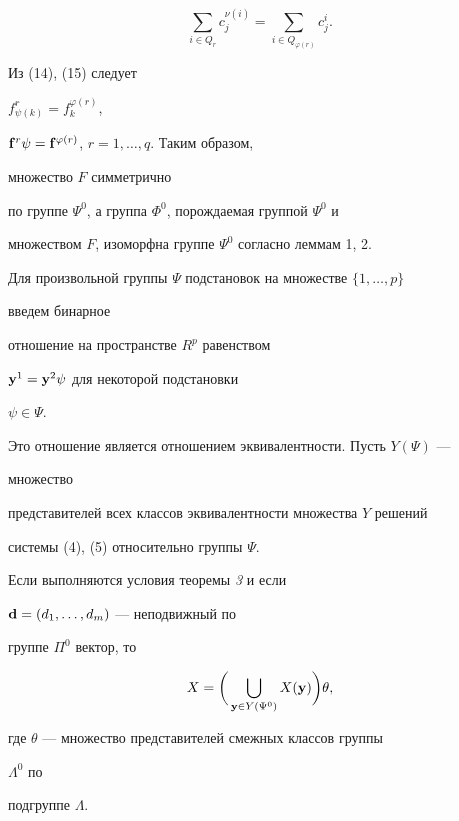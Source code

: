 \begin{pf}
\begin{equation}
\sum_{i\in Q_r}c^{\nu(i)}_j=\sum_{i\in Q_{\varphi(r)}}c^i_j.


\end{equation}


Из (14), (15) следует


$f^r_{\psi(k)}=f^{\varphi(r)}_k$,


$\bold f^r\psi=\bold f^{\varphi(r)}$, $r=1,\dotsc,q$. Таким образом,


множество $F$ симметрично


по группе $\Psi^0$, а группа $\Phi^0$, порождаемая группой $\Psi^0$ и


множеством $F$, изоморфна группе $\Psi^0$ согласно леммам 1, 2.


\end{pf}





Для произвольной группы $\Psi$ подстановок на множестве $\{1,\dotsc,p\}$


введем бинарное


отношение на пространстве $R^p$ равенством


$\bold y^1=\bold y^2\psi$ для некоторой подстановки


$\psi\in\Psi$.


Это отношение является отношением эквивалентности. Пусть $Y(\Psi)$ ---


множество


представителей всех классов эквивалентности множества $Y$ решений


системы (4), (5) относительно группы $\Psi$.





\begin{thm}


Если выполняются условия теоремы {\em 3} и если


$\bold d=(d_1,\dotsc,d_m)$ --- неподвижный по


группе $\Pi^0$ вектор, то


\begin{equation}


X=\biggl(\,\bigcup_{\bold y\in Y(\Psi^0)}X(\bold y)\biggr)\theta,


\end{equation}


где $\theta$ --- множество представителей смежных классов группы


$\Lambda^0$ по


подгруппе $\Lambda$.


\end{thm}





